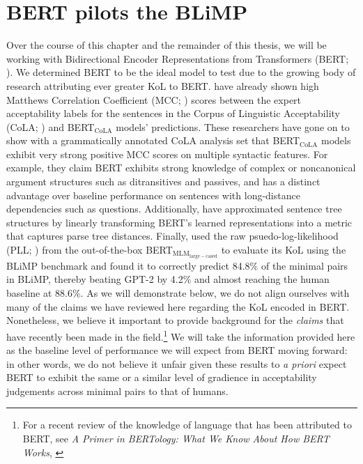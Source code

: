 \section{BERT pilots the BLiMP}
\label{section:2.1}
Over the course of this chapter and the remainder of this thesis, we will be working with Bidirectional Encoder Representations from Transformers (BERT; \citet{devlin2018bert}).  We determined BERT to be the ideal model to test due to the growing body of research attributing ever greater KoL to BERT. \citet{warstadt2019linguistic} have already shown high Matthews Correlation Coefficient (MCC; \citealp{matthews1975comparison}) scores between the expert acceptability labels for the sentences in the Corpus of Linguistic Acceptability (CoLA; \citealp{warstadt2019neural}) and BERT$_\mathrm{CoLA}$ models' predictions.  These researchers have gone on to show with a grammatically annotated CoLA analysis set that BERT$_\mathrm{CoLA}$ models exhibit very strong positive MCC scores on multiple syntactic features.  For example, they claim BERT exhibits strong knowledge of complex or noncanonical argument structures such as ditransitives and passives, and has a distinct advantage over baseline performance on sentences with long-distance dependencies such as questions.  %
Additionally, \citet{Manning2020} have approximated sentence tree structures by linearly transforming BERT's learned representations into a metric that captures parse tree distances.  Finally, \citet{salazar2020} used the raw psuedo-log-likelihood (PLL; \citealp{wang2019bert,shin2019effective,salazar2020}) from the out-of-the-box BERT$_\mathrm{MLM_{large-cased}}$ to evaluate its KoL using the BLiMP benchmark and found it to correctly predict 84.8\% of the minimal pairs in BLiMP, thereby beating GPT-2 by 4.2\% and almost reaching the human baseline at 88.6\%.  As we will demonstrate below, we do not align ourselves with many of the claims we have reviewed here regarding the KoL encoded in BERT. Nonetheless, we believe it important to provide background for the \textit{claims} that have recently been made in the field.\footnote{For a recent review of the knowledge of language that has been attributed to BERT, see \textit{A Primer in BERTology: What We Know About How BERT Works}, \citep{rogers2021primer}} %
We will take the information provided here as the baseline level of performance we will expect from BERT moving forward: in other words, we do not believe it unfair given these results to \textit{a priori} expect BERT to exhibit the same or a similar level of gradience in acceptability judgements across minimal pairs to that of humans.



